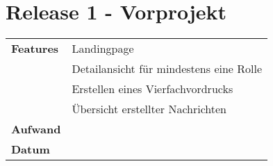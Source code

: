\section*{Release 1 - Vorprojekt}
\label{sec:release_1}

\begin{tabular}{p{5cm} p{9cm}}
    \textbf{Features} &  Landingpage \\
    & Detailansicht für mindestens eine Rolle \\
    & Erstellen eines Vierfachvordrucks \\
    & Übersicht erstellter Nachrichten \\
    \hline
    \textbf{Aufwand} &  \\
    \hline
    \textbf{Datum} & 
\end{tabular}
